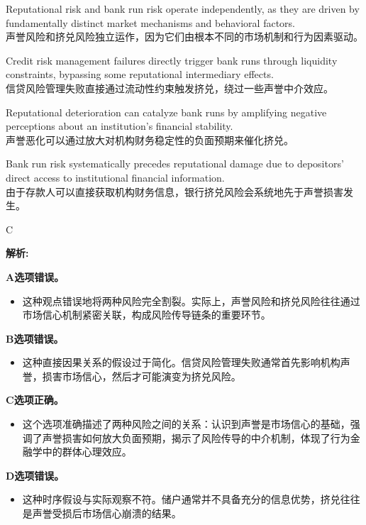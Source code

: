 \documentclass{article}
\newenvironment{explanation}
{\textbf{解析:}\par}
{\par}
\begin{document}
    \begin{choices}
    \item Reputational risk and bank run risk operate independently, as they are driven by fundamentally distinct market mechanisms and behavioral factors. \\
    声誉风险和挤兑风险独立运作，因为它们由根本不同的市场机制和行为因素驱动。
    
    \item Credit risk management failures directly trigger bank runs through liquidity constraints, bypassing some reputational intermediary effects. \\
    信贷风险管理失败直接通过流动性约束触发挤兑，绕过一些声誉中介效应。
    
    \item Reputational deterioration can catalyze bank runs by amplifying negative perceptions about an institution's financial stability. \\
    声誉恶化可以通过放大对机构财务稳定性的负面预期来催化挤兑。
    
    \item Bank run risk systematically precedes reputational damage due to depositors' direct access to institutional financial information. \\
    由于存款人可以直接获取机构财务信息，银行挤兑风险会系统地先于声誉损害发生。 
    \end{choices}
    
    \begin{correctanswer}
    C
    \end{correctanswer}
    
    \begin{explanation}
    \textbf{A选项错误。}
    \begin{itemize}
        \item 这种观点错误地将两种风险完全割裂。实际上，声誉风险和挤兑风险往往通过市场信心机制紧密关联，构成风险传导链条的重要环节。
    \end{itemize}
    
    \textbf{B选项错误。}
    \begin{itemize}
        \item 这种直接因果关系的假设过于简化。信贷风险管理失败通常首先影响机构声誉，损害市场信心，然后才可能演变为挤兑风险。
    \end{itemize}
    
    \textbf{C选项正确。}
    \begin{itemize}
        \item 这个选项准确描述了两种风险之间的关系：认识到声誉是市场信心的基础，强调了声誉损害如何放大负面预期，揭示了风险传导的中介机制，体现了行为金融学中的群体心理效应。
    \end{itemize}
    
    \textbf{D选项错误。}
    \begin{itemize}
        \item 这种时序假设与实际观察不符。储户通常并不具备充分的信息优势，挤兑往往是声誉受损后市场信心崩溃的结果。
    \end{itemize}
    \end{explanation}
\end{document}

